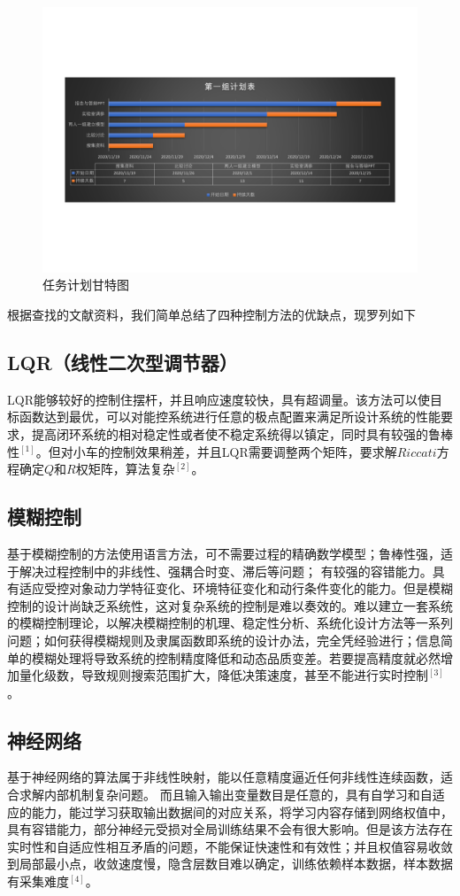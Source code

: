 \begin{figure}[h]
\centering
    \includegraphics[width=12cm]{gant.pdf}
    \caption{任务计划甘特图}
    \label{fig:gant}
\end{figure}


根据查找的文献资料，我们简单总结了四种控制方法的优缺点，现罗列如下

\subsection{LQR（线性二次型调节器）}
 LQR能够较好的控制住摆杆，并且响应速度较快，具有超调量。该方法可以使目标函数达到最优，可以对能控系统进行任意的极点配置来满足所设计系统的性能要求，提高闭环系统的相对稳定性或者使不稳定系统得以镇定，同时具有较强的鲁棒性$^{[1]}$。但对小车的控制效果稍差，并且LQR需要调整两个矩阵，要求解$Riccati$方程确定$Q$和$R$权矩阵，算法复杂$^{[2]}$。

\subsection{模糊控制}
基于模糊控制的方法使用语言方法，可不需要过程的精确数学模型；鲁棒性强，适于解决过程控制中的非线性、强耦合时变、滞后等问题；
有较强的容错能力。具有适应受控对象动力学特征变化、环境特征变化和动行条件变化的能力。但是模糊控制的设计尚缺乏系统性，这对复杂系统的控制是难以奏效的。难以建立一套系统的模糊控制理论，以解决模糊控制的机理、稳定性分析、系统化设计方法等一系列问题；如何获得模糊规则及隶属函数即系统的设计办法，完全凭经验进行；信息简单的模糊处理将导致系统的控制精度降低和动态品质变差。若要提高精度就必然增加量化级数，导致规则搜索范围扩大，降低决策速度，甚至不能进行实时控制$^{[3]}$。

\subsection{神经网络}
基于神经网络的算法属于非线性映射，能以任意精度逼近任何非线性连续函数，适合求解内部机制复杂问题。
而且输入输出变量数目是任意的，具有自学习和自适应的能力，能过学习获取输出数据间的对应关系，将学习内容存储到网络权值中，具有容错能力，部分神经元受损对全局训练结果不会有很大影响。但是该方法存在实时性和自适应性相互矛盾的问题，不能保证快速性和有效性；并且权值容易收敛到局部最小点，收敛速度慢，隐含层数目难以确定，训练依赖样本数据，样本数据有采集难度$^{[4]}$。

